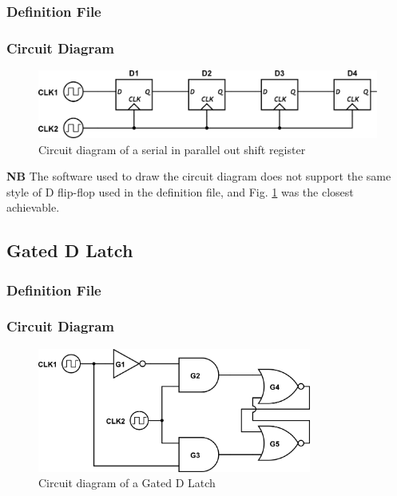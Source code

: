 \documentclass[a4paper,10pt]{article}
\begin{document}
\subsubsection{Definition File}


\subsubsection{Circuit Diagram}
\begin{figure}[h]
 \centering
 \includegraphics[width=12cm]{../../examples/sipo.png}
 \caption{Circuit diagram of a serial in parallel out shift register}
 \label{fig:example-sipo}
\end{figure}

\textbf{NB} The software used to draw the circuit diagram does not support the same style of D flip-flop used in the definition file, and Fig. \ref{fig:example-sipo} was the closest achievable.

\subsection{Gated D Latch}

\subsubsection{Definition File}


\subsubsection{Circuit Diagram}
\begin{figure}[h]
 \centering
 \includegraphics[width=9cm]{../../examples/gated-d-latch.png}
 \caption{Circuit diagram of a Gated D Latch}
 \label{fig:example-dlatch}
\end{figure}
\end{document}
